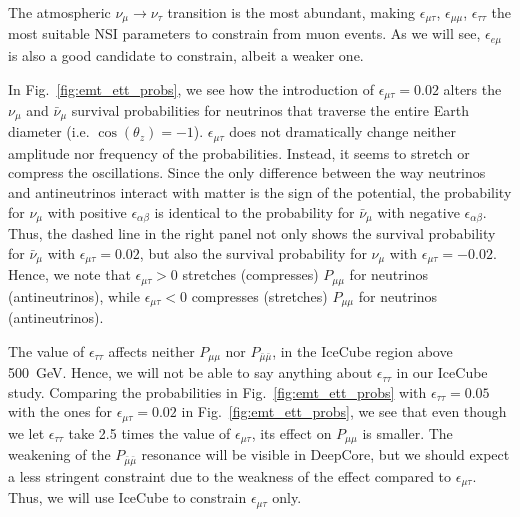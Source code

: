 \documentclass{revtex4-2}
\newcommand{\z}{\ensuremath{\cos{(\theta_z)}}}
\newcommand{\emm}{\ensuremath{\epsilon_{\mu\mu}}}
\newcommand{\emt}{\ensuremath{\epsilon_{\mu\tau}}}
\newcommand{\eem}{\epsilon_{e\mu}}
\newcommand{\ett}{\ensuremath{\epsilon_{\tau\tau}}}
\newcommand{\nm}{\nu_\mu}
\newcommand{\nt}{\nu_\tau}
\newcommand{\anm}{\bar\nu_\mu}
\newcommand{\Pmm}{P_{\mu\mu}}
\newcommand{\Pamam}{P_{\bar{\mu}  \bar{\mu}}}
\begin{document}

The atmospheric $\nm \to \nt$ transition is the most abundant, making $\emt$, $\emm$, $\ett$ the most suitable
NSI parameters to constrain from muon events. As we will see, $\eem$ is also a good candidate to constrain, albeit a weaker one. 

In Fig.~\ref{fig:emt_ett_probs}, we see how the introduction of $\emt = 0.02$ alters the $\nm$ and $\anm$ survival probabilities
for neutrinos that traverse the entire Earth diameter (i.e. $\z = -1$). $\emt$ does not dramatically change neither
amplitude nor frequency of the probabilities. Instead, it seems to stretch or compress the oscillations. Since the 
only difference between the way neutrinos and antineutrinos interact with matter is the sign of the potential, the probability for
$\nm$ with positive $\epsilon_{\alpha\beta}$ is identical to the probability for $\anm$ with negative $\epsilon_{\alpha\beta}$. Thus, the dashed line 
in the right panel not only shows the survival probability for $\anm$ with $\emt=0.02$, but also the survival probability for $\nm$ with $\emt=-0.02$.
Hence, we note that $\emt > 0$ stretches (compresses) $\Pmm$ for neutrinos (antineutrinos), while $\emt < 0$ compresses (stretches) $\Pmm$ for neutrinos (antineutrinos).

The value of $\ett$ affects neither $\Pmm$ nor $\Pamam$, in the IceCube region above \SI{500}{\GeV}. Hence, we will not be able
to say anything about $\ett$ in our IceCube study.  Comparing the probabilities in Fig.~\ref{fig:emt_ett_probs} with $\ett = 0.05$ with the ones for $\emt = 0.02$ in Fig.~\ref{fig:emt_ett_probs},
we see that even though we let $\ett$ take 2.5 times the value of $\emt$, its effect on $\Pmm$ is smaller. The weakening of the $\Pamam$ resonance will be visible in DeepCore, but we should expect a less stringent 
constraint due to the weakness of the effect compared to $\emt$. Thus, we will use IceCube to constrain $\emt$ only.
\end{document}
